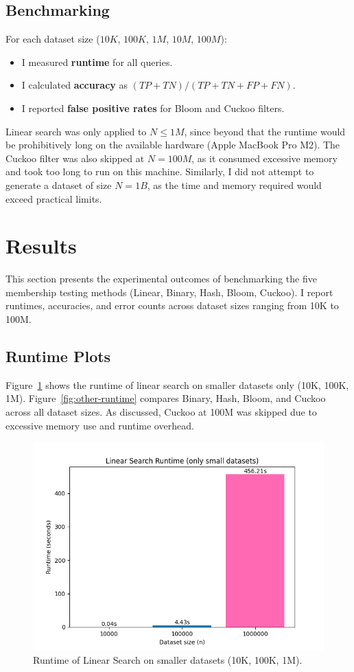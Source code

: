 \documentclass[acmsmall]{acmart}
\begin{document}
\subsection{Benchmarking}
For each dataset size ($10K$, $100K$, $1M$, $10M$, $100M$):  
\begin{itemize}
  \item I measured \textbf{runtime} for all queries.  
  \item I calculated \textbf{accuracy} as $(TP+TN)/(TP+TN+FP+FN)$.  
  \item I reported \textbf{false positive rates} for Bloom and Cuckoo filters.  
\end{itemize}
Linear search was only applied to $N \leq 1M$, since beyond that the runtime would be prohibitively long on the available hardware (Apple MacBook Pro M2). The Cuckoo filter was also skipped at $N=100M$, as it consumed excessive memory and took too long to run on this machine. Similarly, I did not attempt to generate a dataset of size $N=1B$, as the time and memory required would exceed practical limits. 

\section{Results}

This section presents the experimental outcomes of benchmarking the five membership testing methods (Linear, Binary, Hash, Bloom, Cuckoo). I report runtimes, accuracies, and error counts across dataset sizes ranging from 10K to 100M.  

\subsection{Runtime Plots}

Figure~\ref{fig:linear-runtime} shows the runtime of linear search on smaller datasets only (10K, 100K, 1M). Figure~\ref{fig:other-runtime} compares Binary, Hash, Bloom, and Cuckoo across all dataset sizes. As discussed, Cuckoo at 100M was skipped due to excessive memory use and runtime overhead.

\begin{figure}[H]
    \centering
    \includegraphics[width=0.7\linewidth]{plots/linear_plot.png}
    \caption{Runtime of Linear Search on smaller datasets (10K, 100K, 1M).}
    \label{fig:linear-runtime}
\end{figure}
\end{document}
